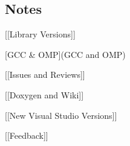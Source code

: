 \subsection*{Notes}


\begin{DoxyItemize}
\item \mbox{[}\mbox{[}Library Versions\mbox{]}\mbox{]}
\item \mbox{[}G\-C\-C \& O\-M\-P\mbox{]}(G\-C\-C and O\-M\-P)
\item \mbox{[}\mbox{[}Issues and Reviews\mbox{]}\mbox{]}
\item \mbox{[}\mbox{[}Doxygen and Wiki\mbox{]}\mbox{]}
\item \mbox{[}\mbox{[}New Visual Studio Versions\mbox{]}\mbox{]}
\item \mbox{[}\mbox{[}Feedback\mbox{]}\mbox{]} 
\end{DoxyItemize}
